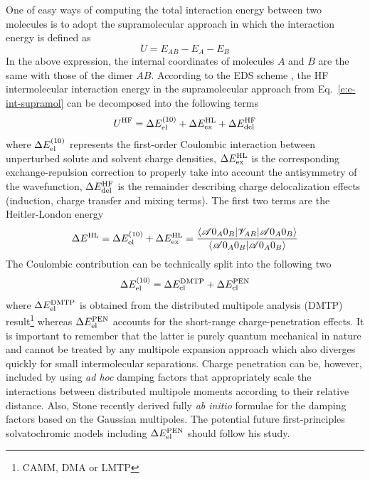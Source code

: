 \documentclass[b5paper,oneside,fleqn,11pt]{book}
\begin{document}
\begin{refsection}
One of easy ways of computing the total interaction energy
between two molecules is to adopt the supramolecular approach
in which the interaction energy is defined as
%
\begin{equation} \label{e:e-int-supramol}
 U = E_{AB} - E_A - E_B
\end{equation}
%
In the above expression, the internal coordinates of molecules $A$ and $B$
are the same with those of the dimer $AB$.
According to the EDS scheme \citep{Sokalski.Roszak.Pecul.CPL.1988,
Chalasinski.Szczesniak.MolPhys.1988,Cybulski.Chalasinski.Moszynski.JCP.1990,
Gora.Bartkowiak.Roszak.Leszczynski.JCP.2004}, the HF
intermolecular interaction energy in the supramolecular
approach from Eq.~\eqref{e:e-int-supramol} can be decomposed
into the following terms
%
\begin{equation}
 U^{\rm HF} = \Delta E_{\rm el}^{(10)}    + 
              \Delta E_{\rm ex}^{\rm HL}  +
              \Delta E_{\rm del}^{\rm HF}
\end{equation}
%
where $\Delta E_{\rm el}^{(10)}$ represents the first\hyp{}order 
Coulombic interaction
between unperturbed solute and solvent charge densities, 
$\Delta E_{\rm ex}^{\rm HL}$ is the corresponding exchange\hyp{}repulsion
correction to properly take into account the antisymmetry of the wavefunction,
$\Delta E_{\rm del}^{\rm HF}$ is the remainder describing charge delocalization
effects (induction, charge transfer and mixing terms). The first two terms
are the Heitler\hyp{}London energy
%
\begin{equation}
 \Delta E^{\rm HL} = \Delta E_{\rm el}^{(10)}    + 
                     \Delta E_{\rm ex}^{\rm HL}
  = \frac{
\langle \mathscr{A} 0_A0_B \lvert \mathscr{V}_{AB} \rvert \mathscr{A} 0_A0_B \rangle 
}{
\langle \mathscr{A} 0_A0_B \vert \mathscr{A} 0_A0_B \rangle 
}
\end{equation}
%
The Coulombic contribution can be technically split into the following
two
%
\begin{equation}
 \Delta E_{\rm el}^{(10)} = \Delta E_{\rm el}^{\rm DMTP} + \Delta E_{\rm el}^{\rm PEN}
\end{equation}
%
where $\Delta E_{\rm el}^{\rm DMTP}$ is obtained from the distributed multipole 
analysis (DMTP) result\footnote{CAMM, DMA or LMTP} whereas
$\Delta E_{\rm el}^{\rm PEN}$ accounts for the short\hyp{}range charge\hyp{}penetration
effects. It is important to remember that the latter is purely quantum mechanical in
nature and cannot be treated by any multipole expansion approach which also diverges
quickly for small intermolecular separations.
Charge penetration can be, however, included by using \emph{ad hoc} damping factors
that appropriately scale the interactions between distributed multipole
moments according to their relative distance. \citep{Slipchenko.Gordon.JCC.2007,Wang.Truhlar.JCTC.2010}
Also, Stone recently derived fully \emph{ab initio} formulae
for the damping factors based on the Gaussian multipoles. \citep{Stone.JPCA.2011}
The potential future
first\hyp{}principles solvatochromic
models including $\Delta E_{\rm el}^{\rm PEN}$ should follow his study.


\end{refsection}
\end{document}
